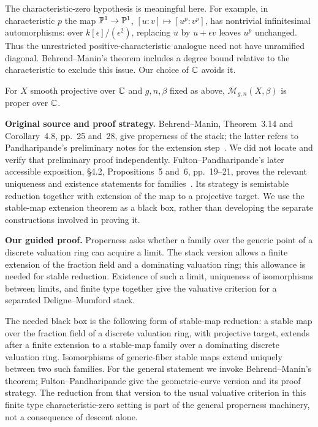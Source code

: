 The characteristic-zero hypothesis is meaningful here. For example, in characteristic $p$ the map $\mathbb P^1\to\mathbb P^1$, $[u:v]\mapsto[u^p:v^p]$, has nontrivial infinitesimal automorphisms: over $k[\epsilon]/(\epsilon^2)$, replacing $u$ by $u+\epsilon v$ leaves $u^p$ unchanged. Thus the unrestricted positive-characteristic analogue need not have unramified diagonal. Behrend--Manin's theorem includes a degree bound relative to the characteristic to exclude this issue. Our choice of $\mathbb C$ avoids it.

\begin{Prop}[Properness]\label{maps:proper}
For $X$ smooth projective over $\mathbb C$ and $g,n,\beta$ fixed as above, $\overline{\mathcal M}_{g,n}(X,\beta)$ is proper over $\mathbb C$.
\end{Prop}

\noindent\textbf{Original source and proof strategy.}
Behrend--Manin, Theorem~3.14 and Corollary~4.8, pp.~25 and~28, give properness of the stack; the latter refers to Pandharipande's preliminary notes for the extension step~\cite{BM}. We did not locate and verify that preliminary proof independently. Fulton--Pandharipande's later accessible exposition, \S4.2, Propositions~5 and~6, pp.~19--21, proves the relevant uniqueness and existence statements for families~\cite{FP}. Its strategy is semistable reduction together with extension of the map to a projective target. We use the stable-map extension theorem as a black box, rather than developing the separate constructions involved in proving it.

\noindent\textbf{Our guided proof.}
Properness asks whether a family over the generic point of a discrete valuation ring can acquire a limit. The stack version allows a finite extension of the fraction field and a dominating valuation ring; this allowance is needed for stable reduction. Existence of such a limit, uniqueness of isomorphisms between limits, and finite type together give the valuative criterion for a separated Deligne--Mumford stack.

The needed black box is the following form of stable-map reduction: a stable map over the fraction field of a discrete valuation ring, with projective target, extends after a finite extension to a stable-map family over a dominating discrete valuation ring. Isomorphisms of generic-fiber stable maps extend uniquely between two such families. For the general statement we invoke Behrend--Manin's theorem; Fulton--Pandharipande give the geometric-curve version and its proof strategy. The reduction from that version to the usual valuative criterion in this finite type characteristic-zero setting is part of the general properness machinery, not a consequence of descent alone.

